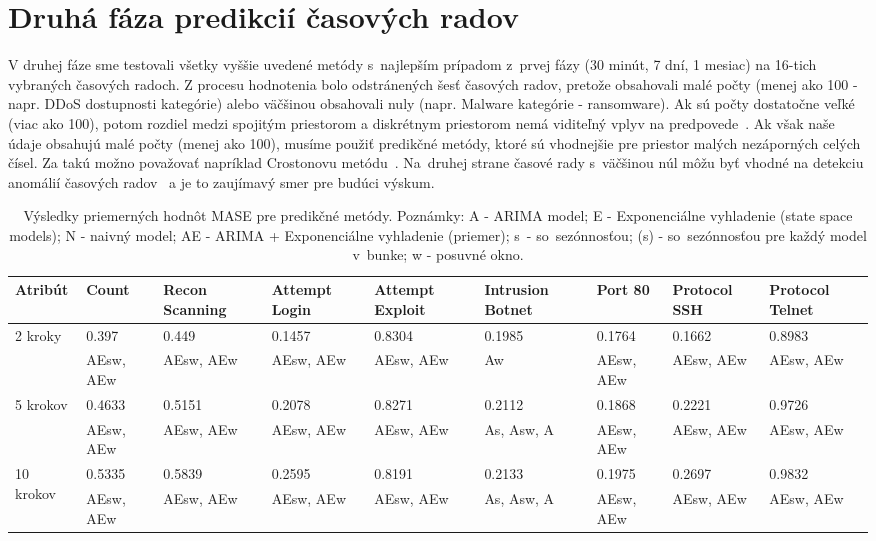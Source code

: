 \documentclass[thesismargins, thesislinespacing, openright, upjsfrontpage]{rnthesis}
\begin{document}
\section{Druhá fáza predikcií časových radov}

V druhej fáze sme testovali všetky vyššie uvedené metódy s~najlepším prípadom z~prvej fázy (30 minút, 7 dní, 1 mesiac) na 16-tich vybraných časových radoch. Z procesu hodnotenia bolo odstránených šesť časových radov, pretože obsahovali malé počty (menej ako 100 - napr. DDoS dostupnosti kategórie) alebo väčšinou obsahovali nuly (napr. Malware kategórie - ransomware). Ak sú počty dostatočne veľké (viac ako 100), potom rozdiel medzi spojitým priestorom a diskrétnym priestorom nemá viditeľný vplyv na predpovede~\cite{hyndman2018forecasting}. Ak však naše údaje obsahujú malé počty (menej ako 100), musíme použiť predikčné metódy, ktoré sú vhodnejšie pre priestor malých nezáporných celých čísel. Za takú možno považovať napríklad Crostonovu metódu~\cite{Croston1972ForecastingAS, Christou2015}. Na~druhej strane časové rady s~väčšinou núl môžu byť vhodné na detekciu anomálií časových radov~\cite{mehrotra2017anomaly} a je to zaujímavý smer pre budúci výskum.

\begin{table}[h]
    \centering
    \footnotesize 
    \begin{tabular}{|p{2cm}|p{1cm}|p{1.4cm}|p{1.2cm}|p{1.2cm}|p{1.4cm}|p{1cm}|p{1.2cm}|p{1.2cm}|} \hline
        Atribút & Count & Recon Scanning & Attempt Login & Attempt Exploit & Intrusion Botnet & Port 80 & Protocol SSH & Protocol Telnet  \\
        \hline\hline
        \multirow{2}{*}{2 kroky} & 0.397 & 0.449 & 0.1457 & 0.8304 & 0.1985 & 0.1764 & 0.1662 & 0.8983 \\
        & AEsw, AEw & AEsw, AEw & AEsw, AEw & AEsw, AEw & Aw & AEsw, AEw & AEsw, AEw & AEsw, AEw  \\
        \hline
        \multirow{2}{*}{5 krokov} & 0.4633 & 0.5151 & 0.2078 & 0.8271 & 0.2112 & 0.1868 & 0.2221 & 0.9726 \\
        & AEsw, AEw & AEsw, AEw & AEsw, AEw & AEsw, AEw & As, Asw, A & AEsw, AEw & AEsw, AEw & AEsw, AEw  \\
        \hline
        \multirow{2}{*}{10 krokov} & 0.5335 & 0.5839 & 0.2595 & 0.8191 & 0.2133 & 0.1975 & 0.2697 & 0.9832 \\
        & AEsw, AEw & AEsw, AEw & AEsw, AEw & AEsw, AEw & As, Asw, A & AEsw, AEw & AEsw, AEw & AEsw, AEw  \\
        \hline     
    \end{tabular}
    \caption{Výsledky priemerných hodnôt MASE pre predikčné metódy. Poznámky: A - ARIMA model; E - Exponenciálne vyhladenie (state space models); N - naivný model; AE - ARIMA + Exponenciálne vyhladenie (priemer); s~- so~sezónnosťou; (s) - so~sezónnosťou pre každý model v~bunke; w - posuvné okno.}
    \label{tab:mase_2nd_stage}
\end{table}
\end{document}
